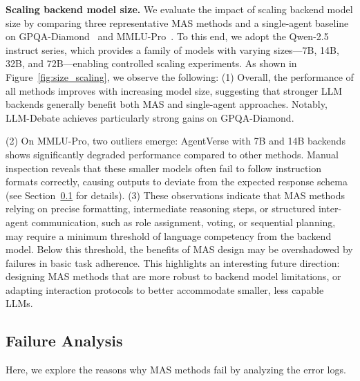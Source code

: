 \documentclass{article}
\begin{document}
\textbf{Scaling backend model size.}
We evaluate the impact of scaling backend model size by comparing three representative MAS methods and a single-agent baseline on GPQA-Diamond~\cite{rein2023gpqa} and MMLU-Pro~\cite{wang2024mmlupro}.
To this end, we adopt the Qwen-2.5 instruct series, which provides a family of models with varying sizes—7B, 14B, 32B, and 72B—enabling controlled scaling experiments.
As shown in Figure~\ref{fig:size_scaling}, we observe the following:
(1) Overall, the performance of all methods improves with increasing model size, suggesting that stronger LLM backends generally benefit both MAS and single-agent approaches.
Notably, LLM-Debate achieves particularly strong gains on GPQA-Diamond.

(2) On MMLU-Pro, two outliers emerge: AgentVerse with 7B and 14B backends shows significantly degraded performance compared to other methods.
Manual inspection reveals that these smaller models often fail to follow instruction formats correctly, causing outputs to deviate from the expected response schema (see Section~\ref{sec:failure} for details).
(3) These observations indicate that MAS methods relying on precise formatting, intermediate reasoning steps, or structured inter-agent communication, such as role assignment, voting, or sequential planning, may require a minimum threshold of language competency from the backend model.
Below this threshold, the benefits of MAS design may be overshadowed by failures in basic task adherence.
This highlights an interesting future direction: designing MAS methods that are more robust to backend model limitations, or adapting interaction protocols to better accommodate smaller, less capable LLMs.

\subsection{Failure Analysis}
\label{sec:failure}

Here, we explore the reasons why MAS methods fail by analyzing the error logs.
\end{document}
